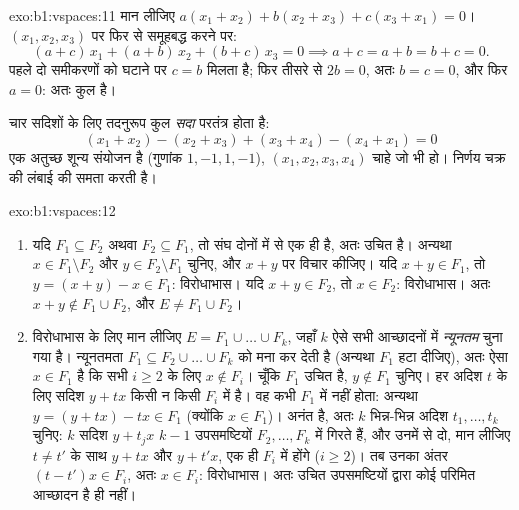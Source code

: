 \begin{solution}{exo:b1:vspaces:11}
मान लीजिए $a(x_1 + x_2) + b(x_2 + x_3) + c(x_3 + x_1) = 0$। 
$(x_1, x_2, x_3)$ पर फिर से समूहबद्ध करने पर:
\[
(a + c)\,x_1 + (a + b)\,x_2 + (b + c)\,x_3 = 0
\implies a + c = a + b = b + c = 0 .
\]
पहले दो समीकरणों को घटाने पर $c = b$ मिलता है; फिर तीसरे से $2b = 0$, अतः $b
= c = 0$, और फिर $a = 0$: अतः कुल  है।

चार सदिशों के लिए तदनुरूप कुल \emph{सदा} परतंत्र होता है:
\[
(x_1 + x_2) - (x_2 + x_3) + (x_3 + x_4) - (x_4 + x_1) = 0
\]
एक अतुच्छ शून्य संयोजन है (गुणांक $1, -1, 1, -1$), $(x_1, x_2, x_3, x_4)$
चाहे जो भी हो। निर्णय चक्र की लंबाई की समता करती है।
\end{solution}

\begin{solution}{exo:b1:vspaces:12}
\begin{enumerate}
  \item यदि $F_1 \subseteq F_2$ अथवा $F_2 \subseteq F_1$, तो संघ दोनों में
  से एक ही है, अतः उचित है। अन्यथा $x \in F_1 \setminus F_2$ और $y \in F_2
  \setminus F_1$ चुनिए, और $x + y$ पर विचार कीजिए। यदि $x + y \in F_1$, तो
  $y = (x + y) - x \in F_1$: विरोधाभास। यदि $x + y \in F_2$, तो $x \in F_2$:
  विरोधाभास। अतः $x + y \notin F_1 \cup F_2$, और $E \neq F_1 \cup F_2$।
  \item विरोधाभास के लिए मान लीजिए $E = F_1 \cup \dots \cup F_k$, जहाँ $k$
  ऐसे सभी आच्छादनों में \emph{न्यूनतम} चुना गया है। न्यूनतमता $F_1 \subseteq
  F_2 \cup \dots \cup F_k$ को मना कर देती है (अन्यथा $F_1$ हटा दीजिए), अतः
  ऐसा $x \in F_1$ है कि सभी $i \geq 2$ के लिए $x \notin F_i$। चूँकि $F_1$
  उचित है, $y \notin F_1$ चुनिए। हर अदिश $t$ के लिए सदिश $y + t x$ किसी न
  किसी $F_i$ में है। वह कभी $F_1$ में नहीं होता: अन्यथा $y = (y + tx) - tx
  \in F_1$ (क्योंकि $x \in F_1$)।  अनंत है, अतः $k$ भिन्न-भिन्न अदिश
  $t_1, \dots, t_k$ चुनिए: $k$ सदिश $y + t_j x$ $k - 1$ उपसमष्टियों $F_2,
  \dots, F_k$ में गिरते हैं, और उनमें से दो, मान लीजिए $t \neq t'$ के साथ $y
  + t x$ और $y + t' x$, एक ही $F_i$ में होंगे ($i \geq 2$)। तब उनका अंतर $(t
  - t')x \in F_i$, अतः $x \in F_i$: विरोधाभास। अतः उचित उपसमष्टियों द्वारा
  कोई परिमित आच्छादन है ही नहीं।
\end{enumerate}
\end{solution}

